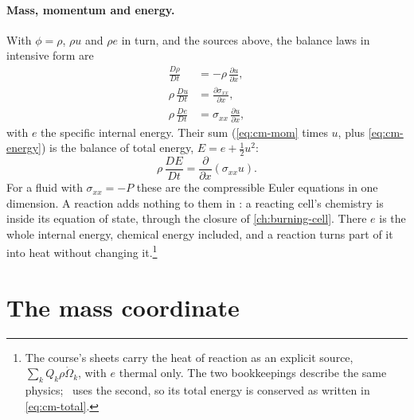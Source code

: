 \paragraph{Mass, momentum and energy.} With $\phi = \rho$, $\rho u$ and
$\rho e$ in turn, and the sources above, the balance laws in intensive
form are
\begin{align}
\frac{D\rho}{Dt} &= -\rho\,\frac{\partial u}{\partial x},
\label{eq:cm-mass}\\
\rho\,\frac{Du}{Dt} &= \frac{\partial \sigma_{xx}}{\partial x},
\label{eq:cm-mom}\\
\rho\,\frac{De}{Dt} &= \sigma_{xx}\,\frac{\partial u}{\partial x},
\label{eq:cm-energy}
\end{align}
with $e$ the specific internal energy. Their sum (\cref{eq:cm-mom} times
$u$, plus \cref{eq:cm-energy}) is the balance of total energy, $E = e +
\tfrac{1}{2}u^2$:
\begin{equation}
\rho\,\frac{DE}{Dt} = \frac{\partial}{\partial x}(\sigma_{xx} u).
\label{eq:cm-total}
\end{equation}
For a fluid with $\sigma_{xx} = -P$ these are the compressible Euler
equations in one dimension. A reaction adds nothing to them in \bw: a
reacting cell's chemistry is inside its equation of state, through the
closure of \cref{ch:burning-cell}. There $e$ is the whole internal energy,
chemical energy included, and a reaction turns part of it into heat
without changing it.\footnote{The course's sheets carry the heat of reaction as an
explicit source, $\sum_k Q_k\rho\dot\Omega_k$, with $e$ thermal only. The
two bookkeepings describe the same physics; \bw\ uses the second, so its
total energy is conserved as written in \cref{eq:cm-total}.}

\section{The mass coordinate}
\label{sec:mass-coordinate}

